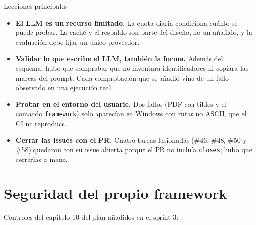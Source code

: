 \documentclass[11pt,a4paper]{report}
\begin{document}
\begin{cajaocre}{Lecciones principales}
\begin{itemize}[leftmargin=1.2em]
\item \textbf{El LLM es un recurso limitado.} La cuota diaria condiciona cuánto se puede probar. La
caché y el respaldo son parte del diseño, no un añadido, y la evaluación debe fijar un único
proveedor.
\item \textbf{Validar lo que escribe el LLM, también la forma.} Además del esquema, hubo que
comprobar que no inventara identificadores ni copiara las marcas del prompt. Cada comprobación que
se añadió vino de un fallo observado en una ejecución real.
\item \textbf{Probar en el entorno del usuario.} Dos fallos (PDF con tildes y el comando
\texttt{framework}) solo aparecían en Windows con rutas no ASCII, que el CI no reproduce.
\item \textbf{Cerrar las issues con el PR.} Cuatro tareas fusionadas (\#46, \#48, \#50 y \#58)
quedaron con su issue abierta porque el PR no incluía \texttt{closes}; hubo que cerrarlas a mano.
\end{itemize}
\end{cajaocre}

\chapter{Seguridad del propio framework}

Controles del capítulo 10 del plan añadidos en el sprint 3:
\end{document}
